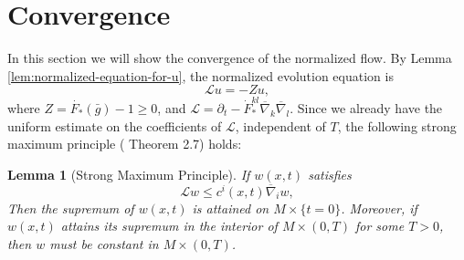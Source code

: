 \documentclass[reqno]{amsart}
\newtheorem{lemma}[theorem]{Lemma}
\theoremstyle{remark}
\newcommand{\bnabla}{\overline{\nabla}}
\newcommand{\bg}{\bar{g}}
\theoremstyle{definition}
\numberwithin{equation}{section}
\begin{document}
\section{Convergence}\label{sec:convergence}
In this section we will show the convergence of the normalized flow. By Lemma \ref{lem:normalized-equation-for-u}, the normalized evolution equation is 
\[ \mathscr{L}u = -Z u, \]
where \(Z = \dot{F_*}(\bg)-1 \geq 0 \), and \(\mathscr{L} = \partial_t - \dot{F}_*^{kl}\bnabla_k \bnabla_l \). Since we already have the uniform estimate on the coefficients of \(\mathscr{L}\), independent of \(T\), the following strong maximum principle (\cite{Lieberman1996} Theorem 2.7) holds: 
\begin{lemma}[Strong Maximum Principle]
  If \(w(x,t)\) satisfies 
    \[ \mathscr{L}w \leq c^i(x,t) \bnabla_i w, \]
    Then the supremum of \(w(x,t)\) is attained on \(M\times \{t=0\}\). Moreover, if \(w(x,t)\) attains its supremum in the interior of \(M \times (0,T)\) for some \(T > 0\), then \(w\) must be constant in \(M \times (0,T)\). 
\end{lemma}
\end{document}
